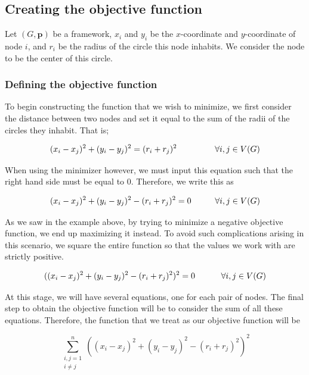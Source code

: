\subsection{Creating the objective function}

\begin{flushleft}
Let $(G, \mathbf{p})$ be a framework, $x_i$ and $y_i$ be the $x$-coordinate and $y$-coordinate of node $i$, and $r_i$ be the radius of the circle this node inhabits. We consider the node to be the center of this circle.
\end{flushleft}

\subsubsection{Defining the objective function}

\begin{flushleft}
To begin constructing the function that we wish to minimize, we first consider the distance between two nodes and set it equal to the sum of the radii of the circles they inhabit. That is;

\begin{equation*}
    (x_i - x_j)^2 + (y_i-y_j)^2 = (r_i + r_j)^2 \hspace{16mm} \forall i,j \in V(G)    
\end{equation*}

\vspace{2mm}
When using the minimizer however, we must input this equation such that the right hand side must be equal to 0. Therefore, we write this as 

\begin{equation*}
    (x_i - x_j)^2 + (y_i-y_j)^2 - (r_i + r_j)^2 = 0 \hspace{10mm} \forall i,j \in V(G)
\end{equation*}

\vspace{2mm}
As we saw in the example above, by trying to minimize a negative objective function, we end up maximizing it instead. To avoid such complications arising in this scenario, we square the entire function so that the values we work with are strictly positive.

\begin{equation*}
    ((x_i - x_j)^2 + (y_i-y_j)^2 - (r_i + r_j)^2)^2 = 0 \hspace{11mm} \forall i,j \in V(G)
\end{equation*}

\vspace{2mm}
At this stage, we will have several equations, one for each pair of nodes. The final step to obtain the objective function will be to consider the sum of all these equations. Therefore, the function that we treat as our objective function will be 

\begin{equation}\label{eq:circle_constraint}
    \sum_{\substack{i,j=1 \\ i \neq j}}^{n} \left( (x_i - x_j)^2 + (y_i - y_j)^2 - (r_i + r_j)^2 \right)^2
  \end{equation}
\end{flushleft}

